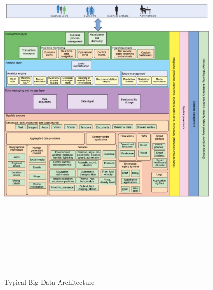 \documentclass[sigconf]{acmart}
\begin{document}
\begin{figure}
\includegraphics[height=7.5in, width=7.5in]{images/BigDataArchitecture.pdf}
\caption{Typical Big Data Architecture}
\end{figure}
\end{document}
